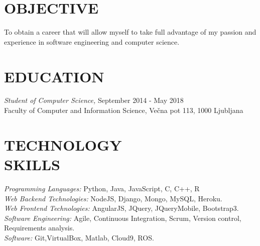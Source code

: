 \documentclass[margin, 10pt]{res} %
\begin{document}
\begin{resume}

 
\section{OBJECTIVE}  

To obtain a career that will allow myself to take full advantage of my passion and experience in software engineering and computer science. 


\section{EDUCATION}

{\sl Student of Computer Science,}  \hfill September 2014 - May 2018 \\
Faculty of Computer and Information Science, Ve\v{c}na pot 113, 1000 Ljubljana\\
 

\section{TECHNOLOGY \\ SKILLS} 

{\sl Programming Languages:}  Python, Java, JavaScript, C, C++, R \\
{\sl Web Backend Technologies:}  NodeJS, Django, Mongo, MySQL, Heroku. \\
{\sl Web Frontend Technologies:} AngularJS, JQuery, JQueryMobile, Bootstrap3. \\
{\sl Software Engineering:} Agile, Continuous Integration, Scrum, Version control, Requirements analysis. \\
{\sl Software:} Git,VirtualBox, Matlab, Cloud9, ROS. \\
 

\end{resume}
\end{document}
